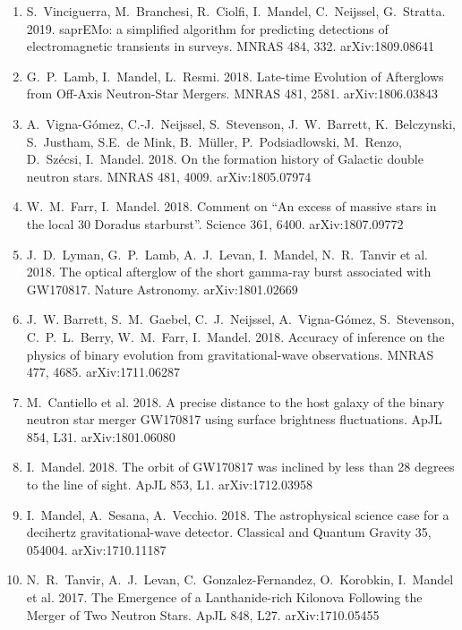 \documentclass[margin,line]{res}
\begin{document}
\begin{resume}
\begin{enumerate}
\item S.~Vinciguerra, M.~Branchesi, R.~Ciolfi, I.~Mandel, C.~Neijssel, G.~Stratta.  2019. saprEMo: a simplified algorithm for predicting detections of electromagnetic transients in surveys.  MNRAS 484, 332.  arXiv:1809.08641

\item G.~P.~Lamb, I.~Mandel, L.~Resmi.  2018.  Late-time Evolution of Afterglows from Off-Axis Neutron-Star Mergers.  MNRAS 481, 2581.  arXiv:1806.03843

\item A.~Vigna-G\'{o}mez, C.-J.~Neijssel, S.~Stevenson, J.~W.~Barrett, K.~Belczynski, S.~Justham, S.E.~de Mink, B.~M{\"u}ller, P.~Podsiadlowski, M.~Renzo, D.~Sz{\'e}csi, I.~Mandel.  2018. On the formation history of Galactic double neutron stars.  MNRAS 481, 4009. arXiv:1805.07974

\item W.~M.~Farr, I.~Mandel.  2018.  Comment on ``An excess of massive stars in the local 30 Doradus starburst''.  Science 361, 6400.  arXiv:1807.09772

\item J.~D.~Lyman, G.~P.~Lamb, A.~J.~Levan, I.~Mandel, N.~R.~Tanvir et al.  2018. The optical afterglow of the short gamma-ray burst associated with GW170817.  Nature Astronomy. arXiv:1801.02669

\item J.~W. Barrett, S.~M.~Gaebel, C.~J.~Neijssel, A.~Vigna-G\'{o}mez, S.~Stevenson, C.~P.~L.~Berry, W.~M.~Farr, I.~Mandel.  2018.  Accuracy of inference on the physics of binary evolution from gravitational-wave observations.   MNRAS 477, 4685.  arXiv:1711.06287

\item M.~Cantiello et al. 2018.  A precise distance to the host galaxy of the binary neutron star merger GW170817 using surface brightness fluctuations.  ApJL 854, L31.  arXiv:1801.06080

\item I.~Mandel.  2018. The orbit of GW170817 was inclined by less than 28 degrees to the line of sight.  ApJL 853, L1. arXiv:1712.03958

\item I.~Mandel, A.~Sesana, A.~Vecchio. 2018.  The astrophysical science case for a decihertz gravitational-wave detector.  Classical and Quantum Gravity 35, 054004. arXiv:1710.11187

\item N.~R.~Tanvir, A.~J.~Levan, C.~Gonzalez-Fernandez, O.~Korobkin, I.~Mandel et al. 2017.  The Emergence of a Lanthanide-rich Kilonova Following the Merger of Two Neutron Stars.  ApJL 848, L27.  arXiv:1710.05455 


\end{enumerate}
\end{resume}
\end{document}
